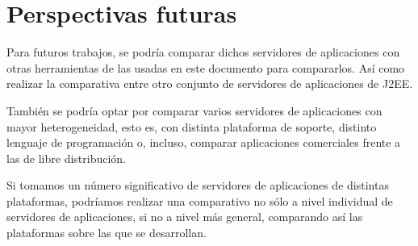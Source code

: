 \documentclass[a4paper, 10pt]{article}
\begin{document}
\section{Perspectivas futuras}
	Para futuros trabajos, se podría comparar dichos servidores de aplicaciones con otras herramientas
	de las usadas en este documento para compararlos. Así como realizar la comparativa entre otro
	conjunto de servidores de aplicaciones de J2EE.
	
	También se podría optar por comparar varios servidores de aplicaciones con mayor heterogeneidad,
	esto es, con distinta plataforma de soporte, distinto lenguaje de programación o, incluso,
	comparar aplicaciones comerciales frente a las de libre distribución.
	
	Si tomamos un número significativo de servidores de aplicaciones de distintas plataformas,
	podríamos realizar una comparativo no sólo a nivel individual de servidores de aplicaciones, si
	no a nivel más general, comparando así las plataformas sobre las que se desarrollan.
	
\end{document}
